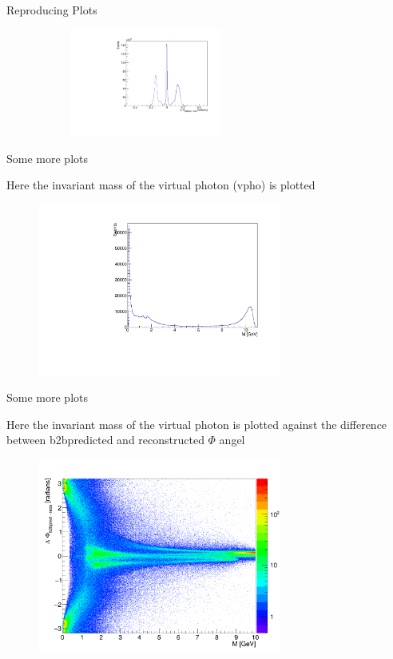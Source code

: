 \documentclass[10pt]{beamer}
\begin{document}
{\begin{frame}{Reproducing Plots}
\begin{figure}
\begin{subfigure}{.5\textwidth}
		\label{fig:sub1}
	\end{subfigure}%
	\begin{subfigure}{.5\textwidth}
		\centering
		\includegraphics[width=5cm]{Plots/DeltaPhi.pdf}
	
		\label{fig:sub2}
	\end{subfigure}

	\label{fig:test}
\end{figure}

\end{frame}


\begin{frame}{Some more plots}

Here the invariant mass of the virtual photon (vpho) is plotted 

	
	\begin{figure}
		\includegraphics[width=8cm]{Plots/vphoM.pdf}
	\end{figure}
	
	
\end{frame}



\begin{frame}{Some more plots}

	Here the invariant mass of the virtual photon is plotted against the difference between b2bpredicted and reconstructed $\Phi $ angel
	\begin{figure}
		\includegraphics[width=8cm]{Plots/PhiM.png}
	\end{figure}
	

\end{frame}}
\end{document}
